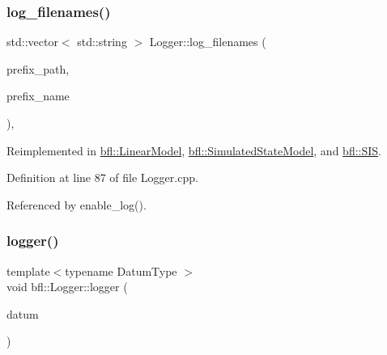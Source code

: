 \mbox{\label{classbfl_1_1Logger_a328ceaa8e70e6918f11142b12b8be217}} 
\subsubsection{\texorpdfstring{log\+\_\+filenames()}{log\_filenames()}}
{\footnotesize\ttfamily std\+::vector$<$ std\+::string $>$ Logger\+::log\+\_\+filenames (\begin{DoxyParamCaption}\item[{const std\+::string \&}]{prefix\+\_\+path,  }\item[{const std\+::string \&}]{prefix\+\_\+name }\end{DoxyParamCaption})\hspace{0.3cm}{\ttfamily [protected]}, {\ttfamily [virtual]}}



Reimplemented in \mbox{\hyperlink{classbfl_1_1LinearModel_a8b8f645a7b7d8ebbb02c8958428fcf10}{bfl\+::\+Linear\+Model}}, \mbox{\hyperlink{classbfl_1_1SimulatedStateModel_ab4212871b8ca425855ec351c13dc3052}{bfl\+::\+Simulated\+State\+Model}}, and \mbox{\hyperlink{classbfl_1_1SIS_a805aef60946bfcaae4f65473dc7bd5ae}{bfl\+::\+S\+IS}}.



Definition at line 87 of file Logger.\+cpp.



Referenced by enable\+\_\+log().

\mbox{\label{classbfl_1_1Logger_a1033ff31398484f2132f84fd140da9e3}} 
\subsubsection{\texorpdfstring{logger()}{logger()}\hspace{0.1cm}{\footnotesize\ttfamily [1/4]}}
{\footnotesize\ttfamily template$<$typename Datum\+Type $>$ \\
void bfl\+::\+Logger\+::logger (\begin{DoxyParamCaption}\item[{Datum\+Type}]{datum }\end{DoxyParamCaption})\hspace{0.3cm}{\ttfamily [inline]}}



